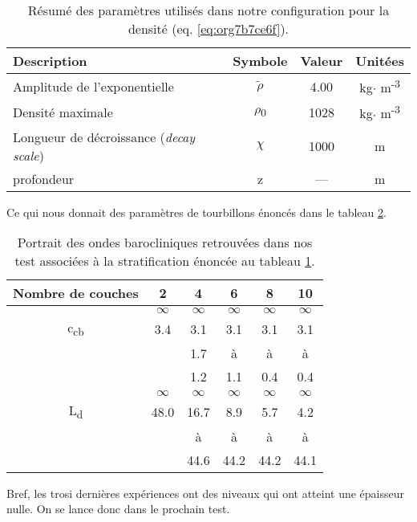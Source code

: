\documentclass[10pt]{article}
\numberwithin{equation}{section}
\begin{document}
\begin{table}[htbp]
\caption{\label{tab:orga7181ef}Résumé des paramètres utilisés dans notre configuration pour la densité (eq. \ref{eq:org7b7ce6f}).}
\centering
\begin{tabular}{lccc}
\hline
\hline
Description & Symbole & Valeur & Unitées\\[0pt]
\hline
Amplitude de l'exponentielle & \(\tilde{\rho}\) & 4.00 & kg\(\cdot\) m\textsuperscript{-3}\\[0pt]
Densité maximale & \(\rho\)\textsubscript{0} & 1028 & kg\(\cdot\) m\textsuperscript{-3}\\[0pt]
Longueur de décroissance (\emph{decay scale}) & \(\chi\) & 1000 & m\\[0pt]
profondeur & z & --- & m\\[0pt]
\hline
\end{tabular}
\end{table}

Ce qui nous donnait des paramètres de tourbillons énoncés dans le tableau \ref{tab:orgd234a41}. 

\begin{table}[htbp]
\caption{\label{tab:orgd234a41}Portrait des ondes barocliniques retrouvées dans nos test  associées à la stratification énoncée au tableau \ref{tab:orga7181ef}.}
\centering
\begin{tabular}{cccccc}
\hline
\hline
Nombre de couches & 2 & 4 & 6 & 8 & 10\\[0pt]
\hline
 & \(\infty\) & \(\infty\) & \(\infty\) & \(\infty\) & \(\infty\)\\[0pt]
c\textsubscript{cb} & 3.4 & 3.1 & 3.1 & 3.1 & 3.1\\[0pt]
[m\(\cdot\) s\textsuperscript{-1}] &  & 1.7 & à & à & à\\[0pt]
 &  & 1.2 & 1.1 & 0.4 & 0.4\\[0pt]
\hline
 & \(\infty\) & \(\infty\) & \(\infty\) & \(\infty\) & \(\infty\)\\[0pt]
L\textsubscript{d} & 48.0 & 16.7 & 8.9 & 5.7 & 4.2\\[0pt]
[km] &  & à & à & à & à\\[0pt]
 &  & 44.6 & 44.2 & 44.2 & 44.1\\[0pt]
\hline
\end{tabular}
\end{table}

Bref, les trosi dernières expériences ont des niveaux qui ont atteint une épaisseur nulle.
On se lance donc dans le prochain test.
\end{document}
